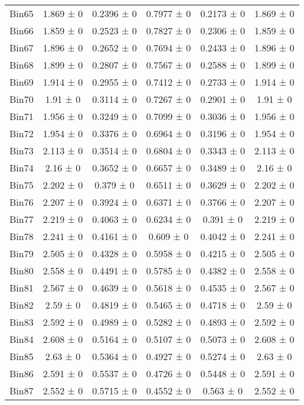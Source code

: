 \begin{tabular}{@{\extracolsep{4pt}}lccccc@{}}
     Bin65 & 1.869 ± 0 & 0.2396 ± 0 & 0.7977 ± 0 & 0.2173 ± 0 & 1.869 ± 0 \\ 
     Bin66 & 1.859 ± 0 & 0.2523 ± 0 & 0.7827 ± 0 & 0.2306 ± 0 & 1.859 ± 0 \\ 
     Bin67 & 1.896 ± 0 & 0.2652 ± 0 & 0.7694 ± 0 & 0.2433 ± 0 & 1.896 ± 0 \\ 
     Bin68 & 1.899 ± 0 & 0.2807 ± 0 & 0.7567 ± 0 & 0.2588 ± 0 & 1.899 ± 0 \\ 
     Bin69 & 1.914 ± 0 & 0.2955 ± 0 & 0.7412 ± 0 & 0.2733 ± 0 & 1.914 ± 0 \\ 
     Bin70 & 1.91 ± 0 & 0.3114 ± 0 & 0.7267 ± 0 & 0.2901 ± 0 & 1.91 ± 0 \\ 
     Bin71 & 1.956 ± 0 & 0.3249 ± 0 & 0.7099 ± 0 & 0.3036 ± 0 & 1.956 ± 0 \\ 
     Bin72 & 1.954 ± 0 & 0.3376 ± 0 & 0.6964 ± 0 & 0.3196 ± 0 & 1.954 ± 0 \\ 
     Bin73 & 2.113 ± 0 & 0.3514 ± 0 & 0.6804 ± 0 & 0.3343 ± 0 & 2.113 ± 0 \\ 
     Bin74 & 2.16 ± 0 & 0.3652 ± 0 & 0.6657 ± 0 & 0.3489 ± 0 & 2.16 ± 0 \\ 
     Bin75 & 2.202 ± 0 & 0.379 ± 0 & 0.6511 ± 0 & 0.3629 ± 0 & 2.202 ± 0 \\ 
     Bin76 & 2.207 ± 0 & 0.3924 ± 0 & 0.6371 ± 0 & 0.3766 ± 0 & 2.207 ± 0 \\ 
     Bin77 & 2.219 ± 0 & 0.4063 ± 0 & 0.6234 ± 0 & 0.391 ± 0 & 2.219 ± 0 \\ 
     Bin78 & 2.241 ± 0 & 0.4161 ± 0 & 0.609 ± 0 & 0.4042 ± 0 & 2.241 ± 0 \\ 
     Bin79 & 2.505 ± 0 & 0.4328 ± 0 & 0.5958 ± 0 & 0.4215 ± 0 & 2.505 ± 0 \\ 
     Bin80 & 2.558 ± 0 & 0.4491 ± 0 & 0.5785 ± 0 & 0.4382 ± 0 & 2.558 ± 0 \\ 
     Bin81 & 2.567 ± 0 & 0.4639 ± 0 & 0.5618 ± 0 & 0.4535 ± 0 & 2.567 ± 0 \\ 
     Bin82 & 2.59 ± 0 & 0.4819 ± 0 & 0.5465 ± 0 & 0.4718 ± 0 & 2.59 ± 0 \\ 
     Bin83 & 2.592 ± 0 & 0.4989 ± 0 & 0.5282 ± 0 & 0.4893 ± 0 & 2.592 ± 0 \\ 
     Bin84 & 2.608 ± 0 & 0.5164 ± 0 & 0.5107 ± 0 & 0.5073 ± 0 & 2.608 ± 0 \\ 
     Bin85 & 2.63 ± 0 & 0.5364 ± 0 & 0.4927 ± 0 & 0.5274 ± 0 & 2.63 ± 0 \\ 
     Bin86 & 2.591 ± 0 & 0.5537 ± 0 & 0.4726 ± 0 & 0.5448 ± 0 & 2.591 ± 0 \\ 
     Bin87 & 2.552 ± 0 & 0.5715 ± 0 & 0.4552 ± 0 & 0.563 ± 0 & 2.552 ± 0 \\ 

\end{tabular}

